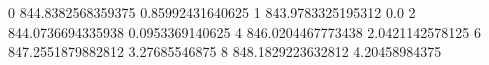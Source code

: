 0 844.8382568359375 0.85992431640625
1 843.9783325195312 0.0
2 844.0736694335938 0.0953369140625
4 846.0204467773438 2.0421142578125
6 847.2551879882812 3.27685546875
8 848.1829223632812 4.20458984375
